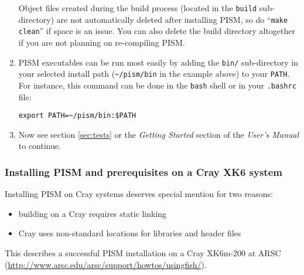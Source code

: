 \documentclass[titlepage,letterpaper,final]{scrartcl}
\begin{document}
\begin{enumerate}
Object files created during the build process (located in the \texttt{build}
sub-directory) are not automatically deleted after installing PISM, so do ``\texttt{make
  clean}'' if space is an issue. You can also delete the build
directory altogether if you are not planning on re-compiling PISM.

\item PISM executables can be run most easily by adding the \texttt{bin/}
  sub-directory in your selected install path
  (\texttt{\textasciitilde/pism/bin} in the example above) to your
  \texttt{PATH}. For instance, this command can be done in the \texttt{bash}
  shell or in your \texttt{.bashrc} file:
\begin{verbatim}
export PATH=~/pism/bin:$PATH
\end{verbatim}

\item Now see section \ref{sec:tests} or the \emph{Getting Started} section of the \emph{User's Manual} to continue.
\end{enumerate}

\subsubsection{Installing PISM and prerequisites on a Cray XK6 system}
\label{subsec:cray}

Installing PISM on Cray systems deserves special mention for two reasons:
\begin{itemize}
\item building on a Cray requires static linking
\item Cray uses non-standard locations for libraries and header files
\end{itemize}
This describes a successful PISM installation on a Cray XK6m-200 at ARSC (\url{http://www.arsc.edu/arsc/support/howtos/usingfish/}).
\end{document}
